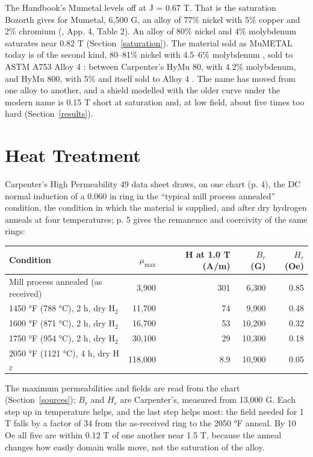 \documentclass[
  11pt,
]{article}
\begin{document}
The Handbook's Mumetal levels off at J = 0.67 T. That is the saturation Bozorth gives for Mumetal, 6,500 G, an alloy of 77\% nickel with 5\% copper and 2\% chromium (\cite{bozorth1951}, App. 4, Table 2). An alloy of 80\% nickel and 4\% molybdenum saturates near 0.82 T (Section~\ref{saturation}). The material sold as MuMETAL today is of the second kind, 80--81\% nickel with 4.5--6\% molybdenum \cite{mumetal-usa}, sold to ASTM A753 Alloy 4 \cite{mumetal-uk}: between Carpenter's HyMu 80, with 4.2\% molybdenum, and HyMu 800, with 5\% and itself sold to Alloy 4 \cite{carpenter-hymu800}. The name has moved from one alloy to another, and a shield modelled with the older curve under the modern name is 0.15 T short at saturation and, at low field, about five times too hard (Section~\ref{results}).

\section{Heat Treatment}\label{heat-treatment}

Carpenter's High Permeability 49 data sheet \cite{carpenter-hp49} draws, on one chart (p. 4), the DC normal induction of a 0.060 in ring in the ``typical mill process annealed'' condition, the condition in which the material is supplied, and after dry hydrogen anneals at four temperatures; p. 5 gives the remanence and coercivity of the same rings:

\begin{center}
\begin{tabular}{lrrrr}
\toprule
Condition & \(\mu_{\max}\) & H at 1.0 T (A/m) & \(B_r\) (G) & \(H_c\) (Oe) \\
\midrule
Mill process annealed (as received) & 3,900 & 301 & 6,300 & 0.85 \\
1450 °F (788 °C), 2 h, dry H\(_2\) & 11,700 & 74 & 9,900 & 0.48 \\
1600 °F (871 °C), 2 h, dry H\(_2\) & 16,700 & 53 & 10,200 & 0.32 \\
1750 °F (954 °C), 2 h, dry H\(_2\) & 30,100 & 29 & 10,300 & 0.18 \\
2050 °F (1121 °C), 4 h, dry H\(_2\) & 118,000 & 8.9 & 10,900 & 0.05 \\
\bottomrule
\end{tabular}
\end{center}

The maximum permeabilities and fields are read from the chart (Section~\ref{sources}); \(B_r\) and \(H_c\) are Carpenter's, measured from 13,000 G. Each step up in temperature helps, and the last step helps most: the field needed for 1 T falls by a factor of 34 from the as-received ring to the 2050 °F anneal. By 10 Oe all five are within 0.12 T of one another near 1.5 T, because the anneal changes how easily domain walls move, not the saturation of the alloy.
\end{document}
